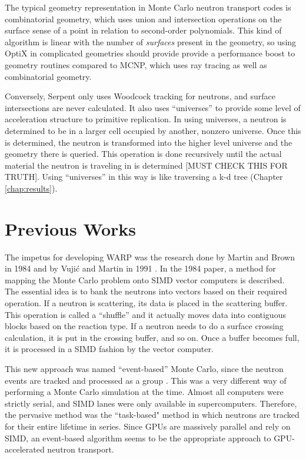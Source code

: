 The typical geometry representation in Monte Carlo neutron transport codes is combinatorial geometry, which uses union and intersection operations on the surface sense  of a point in relation to second-order polynomials.  This kind of algorithm is linear with the number of \emph{surfaces} present in the geometry, so using OptiX in complicated geometries should provide provide a performance boost to geometry routines compared to MCNP, which uses ray tracing as well as combinatorial geometry.  

Conversely, Serpent only uses Woodcock tracking for neutrons, and surface intersections are never calculated.  It also uses ``universes'' to provide some level of acceleration structure to primitive replication.  In using universes, a neutron is determined to be in a larger cell occupied by another, nonzero universe. %
 Once this is determined, the neutron is transformed into the higher level universe and the geometry there is queried.  This operation is done recursively until the actual material the neutron is traveling in is determined \cite{jaakko}[MUST CHECK THIS FOR TRUTH].  Using ``universes'' in this way is like traversing a k-d tree (Chapter \ref{chap:results}).


\section{Previous Works}

The impetus for developing WARP was the research done by Martin and Brown in 1984 \cite{vector} and by Vuji\'{c} and Martin in 1991 \cite{vujic_vector}.  In the 1984 paper, a method for mapping the Monte Carlo problem onto SIMD vector computers is described.  The essential idea is to bank the neutrons into vectors based on their required operation.  If a neutron is scattering, its data is placed in the scattering buffer.  This operation is called a ``shuffle'' and it actually moves data into contiguous blocks based on the reaction type.  If a neutron needs to do a surface crossing calculation, it is put in the crossing buffer, and so on.  Once a buffer becomes full, it is processed in a SIMD fashion by the vector computer.  

This new approach was named ``event-based'' Monte Carlo, since the neutron events are tracked and processed as a group \cite{vector}.  This was a very different way of performing a Monte Carlo simulation at the time.  Almost all computers were strictly serial, and SIMD lanes were only available in supercomputers.  Therefore, the pervasive method was the ``task-based" method in which neutrons are tracked for their entire lifetime in series.  Since GPUs are massively parallel and rely on SIMD, an event-based algorithm seems to be the appropriate approach to GPU-accelerated neutron transport.  

